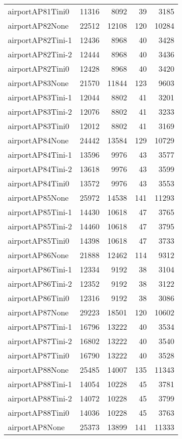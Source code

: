 \begin{longtable}{lrrrr}
airportAP81Tini0 & 11316 & 8092 & 39 & 3185 \\
airportAP82None & 22512 & 12108 & 120 & 10284 \\
airportAP82Tini-1 & 12436 & 8968 & 40 & 3428 \\
airportAP82Tini-2 & 12444 & 8968 & 40 & 3436 \\
airportAP82Tini0 & 12428 & 8968 & 40 & 3420 \\
airportAP83None & 21570 & 11844 & 123 & 9603 \\
airportAP83Tini-1 & 12044 & 8802 & 41 & 3201 \\
airportAP83Tini-2 & 12076 & 8802 & 41 & 3233 \\
airportAP83Tini0 & 12012 & 8802 & 41 & 3169 \\
airportAP84None & 24442 & 13584 & 129 & 10729 \\
airportAP84Tini-1 & 13596 & 9976 & 43 & 3577 \\
airportAP84Tini-2 & 13618 & 9976 & 43 & 3599 \\
airportAP84Tini0 & 13572 & 9976 & 43 & 3553 \\
airportAP85None & 25972 & 14538 & 141 & 11293 \\
airportAP85Tini-1 & 14430 & 10618 & 47 & 3765 \\
airportAP85Tini-2 & 14460 & 10618 & 47 & 3795 \\
airportAP85Tini0 & 14398 & 10618 & 47 & 3733 \\
airportAP86None & 21888 & 12462 & 114 & 9312 \\
airportAP86Tini-1 & 12334 & 9192 & 38 & 3104 \\
airportAP86Tini-2 & 12352 & 9192 & 38 & 3122 \\
airportAP86Tini0 & 12316 & 9192 & 38 & 3086 \\
airportAP87None & 29223 & 18501 & 120 & 10602 \\
airportAP87Tini-1 & 16796 & 13222 & 40 & 3534 \\
airportAP87Tini-2 & 16802 & 13222 & 40 & 3540 \\
airportAP87Tini0 & 16790 & 13222 & 40 & 3528 \\
airportAP88None & 25485 & 14007 & 135 & 11343 \\
airportAP88Tini-1 & 14054 & 10228 & 45 & 3781 \\
airportAP88Tini-2 & 14072 & 10228 & 45 & 3799 \\
airportAP88Tini0 & 14036 & 10228 & 45 & 3763 \\
airportAP8None & 25373 & 13899 & 141 & 11333 \\

\end{longtable}
